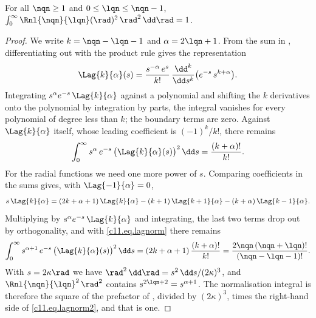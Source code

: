 \begin{vertiefung}
  \begin{proposition}\label{c11.prop.norm}
    For all $\nqn \geq 1$ and $0 \leq \lqn \leq \nqn - 1$,
    $\int_0^\infty \Rnl{\nqn}{\lqn}(\rad)^2\,\rad^2\,\dd\rad = 1$.
  \end{proposition}
  \begin{proof}
    We write $k = \nqn - \lqn - 1$ and $\alpha = 2\lqn + 1$. From the sum in
    , differentiating out with the product rule gives the representation
    \begin{equation}\label{c11.eq.rodrigues}
      \Lag{k}{\alpha}(s) = \frac{s^{-\alpha}\,e^{s}}{k!}\,
        \frac{\dd^k}{\dd s^k}\bigl(e^{-s}\,s^{k + \alpha}\bigr).
    \end{equation}
    Integrating $s^\alpha e^{-s}\,\Lag{k}{\alpha}$ against a polynomial and shifting the
    $k$ derivatives onto the polynomial by integration by parts, the integral vanishes
    for every polynomial of degree less than $k$; the boundary terms are zero. Against
    $\Lag{k}{\alpha}$ itself, whose leading coefficient is $(-1)^k/k!$, there remains
    \begin{equation}\label{c11.eq.lagnorm}
      \int_0^\infty s^{\alpha}\,e^{-s}\,\bigl(\Lag{k}{\alpha}(s)\bigr)^2\,\dd s
      = \frac{(k + \alpha)!}{k!} .
    \end{equation}
    For the radial functions we need one more power of $s$. Comparing coefficients in the
    sums gives, with $\Lag{-1}{\alpha} = 0$,
    \begin{equation}\label{c11.eq.dreiterm}
      s\,\Lag{k}{\alpha} = (2k + \alpha + 1)\,\Lag{k}{\alpha}
        - (k + 1)\,\Lag{k + 1}{\alpha} - (k + \alpha)\,\Lag{k - 1}{\alpha} .
    \end{equation}
    Multiplying by $s^\alpha e^{-s}\,\Lag{k}{\alpha}$ and integrating, the last two terms
    drop out by orthogonality, and with \eqref{c11.eq.lagnorm} there remains
    \begin{equation}\label{c11.eq.lagnorm2}
      \int_0^\infty s^{\alpha + 1}\,e^{-s}\,\bigl(\Lag{k}{\alpha}(s)\bigr)^2\,\dd s
      = (2k + \alpha + 1)\,\frac{(k + \alpha)!}{k!}
      = \frac{2\nqn\,(\nqn + \lqn)!}{(\nqn - \lqn - 1)!} .
    \end{equation}
    With $s = 2\kappa\rad$ we have $\rad^2\,\dd\rad = s^2\,\dd s/(2\kappa)^3$, and
    $\Rnl{\nqn}{\lqn}^2\,\rad^2$ contains $s^{2\lqn + 2} = s^{\alpha + 1}$. The
    normalisation integral is therefore the square of the prefactor of ,
    divided by $(2\kappa)^3$, times the right-hand side of \eqref{c11.eq.lagnorm2}, and
    that is one.
  \end{proof}
\end{vertiefung}


